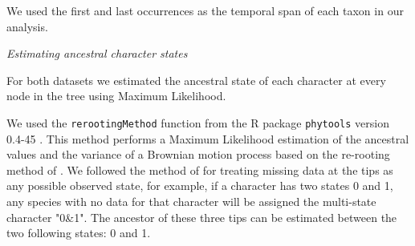 \documentclass[12pt,letterpaper]{article}
\renewcommand{\subsection}[1]{%
\bigskip
\begin{center}
\begin{large}
\normalfont\itshape #1
\end{large}
\end{center}}
\begin{document}
We used the first and last occurrences as the temporal span of each taxon in our analysis.%

\subsection{Estimating ancestral character states}
For both datasets %
we estimated the ancestral state of each character at every node in the tree using 
Maximum Likelihood. 


We used the \texttt{rerootingMethod} function from the R package \texttt{phytools} version 0.4-45 \citep{phytools}. This method performs a Maximum Likelihood estimation of the ancestral values and the variance of a Brownian motion process based on the re-rooting method of \cite{Yang01121995}. 
We followed the method of \cite{Claddis} for treating missing data at the tips as any possible observed state, for example, if a character has two states 0 and 1, any species with no data for that character will be assigned the multi-state character "0\&1". The ancestor of these three tips can be estimated between the two following states: 0 and 1. %
\end{document}
